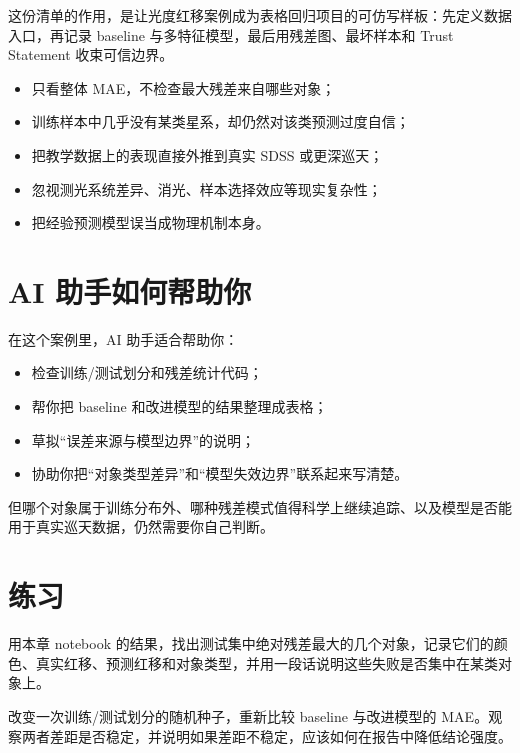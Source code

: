 这份清单的作用，是让光度红移案例成为表格回归项目的可仿写样板：先定义数据入口，再记录 baseline 与多特征模型，最后用残差图、最坏样本和 Trust Statement 收束可信边界。

\begin{warnbox}[光度红移案例中的常见误区]
\begin{itemize}
    \item 只看整体 MAE，不检查最大残差来自哪些对象；
    \item 训练样本中几乎没有某类星系，却仍然对该类预测过度自信；
    \item 把教学数据上的表现直接外推到真实 SDSS 或更深巡天；
    \item 忽视测光系统差异、消光、样本选择效应等现实复杂性；
    \item 把经验预测模型误当成物理机制本身。
\end{itemize}
\end{warnbox}

\section{AI 助手如何帮助你}

在这个案例里，AI 助手适合帮助你：

\begin{itemize}
    \item 检查训练/测试划分和残差统计代码；
    \item 帮你把 baseline 和改进模型的结果整理成表格；
    \item 草拟“误差来源与模型边界”的说明；
    \item 协助你把“对象类型差异”和“模型失效边界”联系起来写清楚。
\end{itemize}

但哪个对象属于训练分布外、哪种残差模式值得科学上继续追踪、以及模型是否能用于真实巡天数据，仍然需要你自己判断。

\section{练习}

\begin{exercisebox}[基础练习]
用本章 notebook 的结果，找出测试集中绝对残差最大的几个对象，记录它们的颜色、真实红移、预测红移和对象类型，并用一段话说明这些失败是否集中在某类对象上。
\end{exercisebox}

\begin{exercisebox}[进阶练习]
改变一次训练/测试划分的随机种子，重新比较 baseline 与改进模型的 MAE。观察两者差距是否稳定，并说明如果差距不稳定，应该如何在报告中降低结论强度。
\end{exercisebox}

